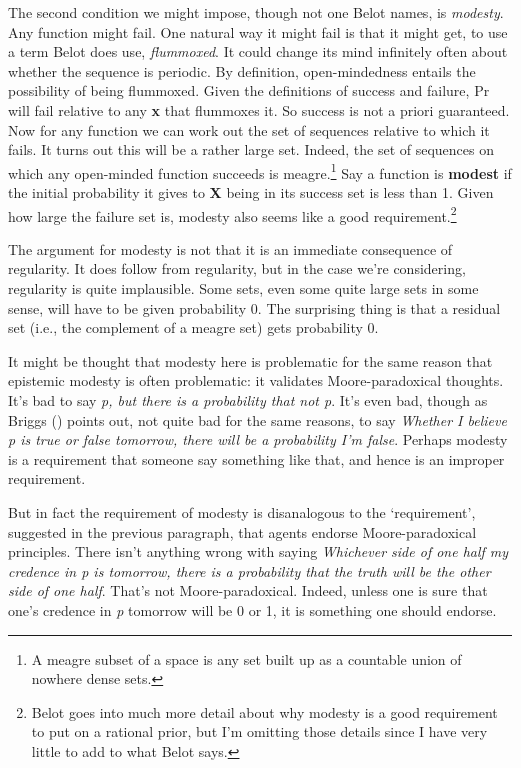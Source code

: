 \documentclass[
  10pt,
  letterpaper,
  DIV=11,
  numbers=noendperiod,
  twoside]{scrartcl}
\begin{document}
The second condition we might impose, though not one Belot names, is
\emph{modesty}. Any function might fail. One natural way it might fail
is that it might get, to use a term Belot does use, \emph{flummoxed}. It
could change its mind infinitely often about whether the sequence is
periodic. By definition, open-mindedness entails the possibility of
being flummoxed. Given the definitions of success and failure, Pr will
fail relative to any \textbf{x} that flummoxes it. So success is not a
priori guaranteed. Now for any function we can work out the set of
sequences relative to which it fails. It turns out this will be a rather
large set. Indeed, the set of sequences on which any open-minded
function succeeds is meagre.\footnote{A meagre subset of a space is any
  set built up as a countable union of nowhere dense sets.} Say a
function is \textbf{modest} if the initial probability it gives to
\textbf{X} being in its success set is less than 1. Given how large the
failure set is, modesty also seems like a good requirement.\footnote{Belot
  goes into much more detail about why modesty is a good requirement to
  put on a rational prior, but I'm omitting those details since I have
  very little to add to what Belot says.}

The argument for modesty is not that it is an immediate consequence of
regularity. It does follow from regularity, but in the case we're
considering, regularity is quite implausible. Some sets, even some quite
large sets in some sense, will have to be given probability 0. The
surprising thing is that a residual set (i.e., the complement of a
meagre set) gets probability 0.

It might be thought that modesty here is problematic for the same reason
that epistemic modesty is often problematic: it validates
Moore-paradoxical thoughts. It's bad to say \emph{p, but there is a
probability that not p}. It's even bad, though as Briggs
() points out, not quite bad for the same
reasons, to say \emph{Whether I believe p is true or false tomorrow,
there will be a probability I'm false}. Perhaps modesty is a requirement
that someone say something like that, and hence is an improper
requirement.

But in fact the requirement of modesty is disanalogous to the
`requirement', suggested in the previous paragraph, that agents endorse
Moore-paradoxical principles. There isn't anything wrong with saying
\emph{Whichever side of one half my credence in p is tomorrow, there is
a probability that the truth will be the other side of one half}. That's
not Moore-paradoxical. Indeed, unless one is sure that one's credence in
\emph{p} tomorrow will be 0 or 1, it is something one should endorse.
\end{document}
